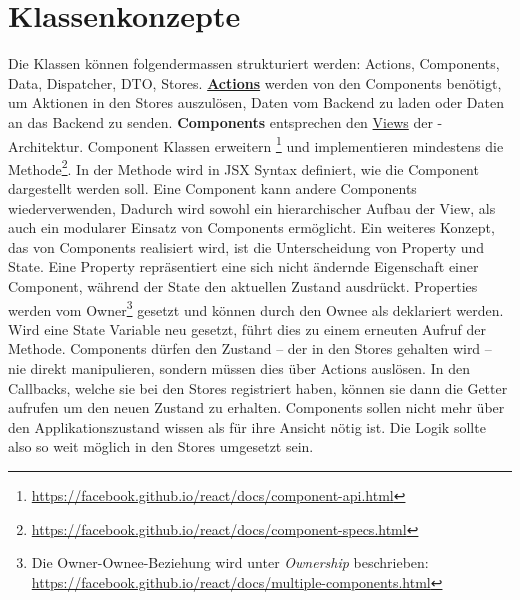 \section{Klassenkonzepte}
\label{pd-klassenkonzepte}
Die Klassen können folgendermassen strukturiert werden: Actions, Components, Data, Dispatcher, DTO, Stores.\newline
\newline
\textbf{\hyperref[pd-flux-actions]{Actions}} werden von den Components benötigt, um Aktionen in den Stores auszulösen, Daten vom \gls{Backend} zu laden oder Daten an das \gls{Backend} zu senden.\newline
\newline
\textbf{Components} entsprechen den \hyperref[pd-flux-views]{Views} der -Architektur.
Component Klassen erweitern \footnote{\url{https://facebook.github.io/react/docs/component-api.html}} und implementieren mindestens die  Methode\footnote{\url{https://facebook.github.io/react/docs/component-specs.html}}. 
In der  Methode wird in \gls{JSX} Syntax definiert, wie die Component dargestellt werden soll.\newline
Eine Component kann andere Components wiederverwenden,
Dadurch wird sowohl ein hierarchischer Aufbau der View, als auch ein modularer Einsatz von Components  ermöglicht.\newline
Ein weiteres Konzept, das von Components realisiert wird, ist die Unterscheidung von Property und State.
Eine Property repräsentiert eine sich nicht ändernde Eigenschaft einer Component, während der State den aktuellen Zustand ausdrückt.
Properties werden vom Owner\footnote{Die Owner-Ownee-Beziehung wird unter \emph{Ownership} beschrieben: \url{https://facebook.github.io/react/docs/multiple-components.html}} gesetzt und können durch den Ownee als  deklariert werden.
Wird eine State Variable neu gesetzt, führt dies zu einem erneuten Aufruf der  Methode.\newline
Components dürfen den Zustand -- der in den Stores gehalten wird -- nie direkt manipulieren, sondern müssen dies über Actions auslösen.
In den Callbacks, welche sie bei den Stores registriert haben, können sie dann die Getter aufrufen um den neuen Zustand zu erhalten.
Components sollen nicht mehr über den Applikationszustand wissen als für ihre Ansicht nötig ist.
Die Logik sollte also so weit möglich in den Stores umgesetzt sein.\newline
\newline
